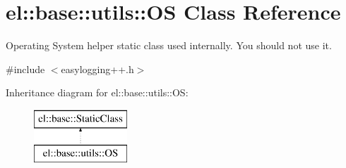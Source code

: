 \hypertarget{classel_1_1base_1_1utils_1_1_o_s}{}\section{el\+:\+:base\+:\+:utils\+:\+:O\+S Class Reference}
\label{classel_1_1base_1_1utils_1_1_o_s}


Operating System helper static class used internally. You should not use it.  




{\ttfamily \#include $<$easylogging++.\+h$>$}

Inheritance diagram for el\+:\+:base\+:\+:utils\+:\+:O\+S\+:\begin{figure}[H]
\begin{center}
\leavevmode
\includegraphics[height=2.000000cm]{classel_1_1base_1_1utils_1_1_o_s}
\end{center}
\end{figure}
